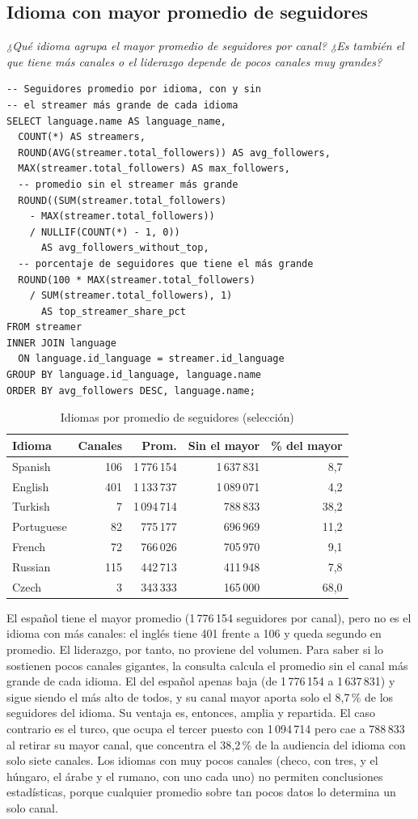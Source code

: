 \documentclass[conference]{IEEEtran}
\begin{document}
\subsection{Idioma con mayor promedio de seguidores}
\emph{¿Qué idioma agrupa el mayor promedio de seguidores por canal? ¿Es también el que tiene más canales o el liderazgo depende de pocos canales muy grandes?}
\begin{lstlisting}
-- Seguidores promedio por idioma, con y sin
-- el streamer más grande de cada idioma
SELECT language.name AS language_name,
  COUNT(*) AS streamers,
  ROUND(AVG(streamer.total_followers)) AS avg_followers,
  MAX(streamer.total_followers) AS max_followers,
  -- promedio sin el streamer más grande
  ROUND((SUM(streamer.total_followers)
    - MAX(streamer.total_followers))
    / NULLIF(COUNT(*) - 1, 0))
      AS avg_followers_without_top,
  -- porcentaje de seguidores que tiene el más grande
  ROUND(100 * MAX(streamer.total_followers)
    / SUM(streamer.total_followers), 1)
      AS top_streamer_share_pct
FROM streamer
INNER JOIN language
  ON language.id_language = streamer.id_language
GROUP BY language.id_language, language.name
ORDER BY avg_followers DESC, language.name;
\end{lstlisting}
\begin{table}[!h]
\caption{Idiomas por promedio de seguidores (selección)}
\centering\footnotesize
\begin{tabular}{@{}lrrrr@{}}
\toprule
Idioma & Canales & Prom. & Sin el mayor & \% del mayor \\
\midrule
Spanish & 106 & 1\,776\,154 & 1\,637\,831 & 8,7 \\
English & 401 & 1\,133\,737 & 1\,089\,071 & 4,2 \\
Turkish & 7 & 1\,094\,714 & 788\,833 & 38,2 \\
Portuguese & 82 & 775\,177 & 696\,969 & 11,2 \\
French & 72 & 766\,026 & 705\,970 & 9,1 \\
Russian & 115 & 442\,713 & 411\,948 & 7,8 \\
Czech & 3 & 343\,333 & 165\,000 & 68,0 \\
\bottomrule
\end{tabular}
\end{table}
El español tiene el mayor promedio (1\,776\,154 seguidores por canal), pero no es el idioma con más canales: el inglés tiene 401 frente a 106 y queda segundo en promedio. El liderazgo, por tanto, no proviene del volumen. Para saber si lo sostienen pocos canales gigantes, la consulta calcula el promedio sin el canal más grande de cada idioma. El del español apenas baja (de 1\,776\,154 a 1\,637\,831) y sigue siendo el más alto de todos, y su canal mayor aporta solo el 8,7\,\% de los seguidores del idioma. Su ventaja es, entonces, amplia y repartida. El caso contrario es el turco, que ocupa el tercer puesto con 1\,094\,714 pero cae a 788\,833 al retirar su mayor canal, que concentra el 38,2\,\% de la audiencia del idioma con solo siete canales. Los idiomas con muy pocos canales (checo, con tres, y el húngaro, el árabe y el rumano, con uno cada uno) no permiten conclusiones estadísticas, porque cualquier promedio sobre tan pocos datos lo determina un solo canal.
\end{document}
